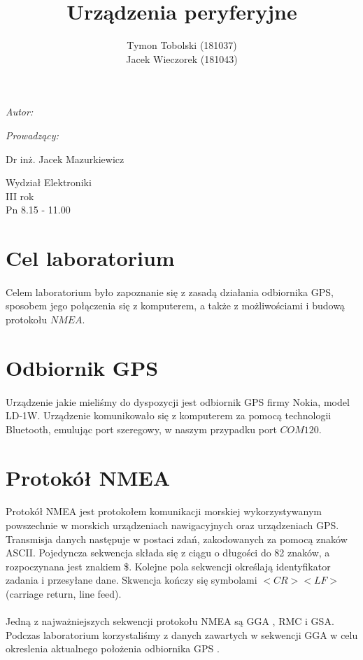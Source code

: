\documentclass[wide,a4paper,titlepage,12pt] {article}
\title{Urządzenia peryferyjne}
\author{Tymon Tobolski (181037)\\ Jacek Wieczorek (181043)}
\makeatletter
\renewcommand{\maketitle}{
\begin{titlepage}
  \begin{center}
    \vspace*{3cm}
    \LARGE \@title \par
    \vspace{2cm}
    \textit{\small Autor:}\par
    \normalsize \@author\par \normalsize
    \vspace{3cm}
    \textit{\small Prowadzący:}\par
    Dr inż. Jacek Mazurkiewicz \par
    \vspace{2cm}
    Wydział Elektroniki\\ III rok\\ Pn 8.15 - 11.00\par
    \vspace{4cm}
    \small \@date
  \end{center}
\end{titlepage}
}
\makeatother
\begin{document}
\maketitle

\section{Cel laboratorium}
\paragraph{}
Celem laboratorium było zapoznanie się z zasadą działania odbiornika GPS, sposobem jego połączenia się z komputerem, a także z możliwościami i budową protokołu $NMEA$.

\section{Odbiornik GPS}
\paragraph{}
Urządzenie jakie mieliśmy do dyspozycji jest odbiornik GPS firmy Nokia, model LD-1W. Urządzenie komunikowało się z komputerem za pomocą technologii Bluetooth, emulując port szeregowy, w naszym przypadku port $COM120$.

\section{Protokół NMEA}
\paragraph{}
Protokół NMEA jest protokołem komunikacji morskiej wykorzystywanym powszechnie w morskich urządzeniach nawigacyjnych oraz urządzeniach GPS. Transmisja danych następuje w postaci zdań, zakodowanych za pomocą znaków ASCII. Pojedyncza sekwencja składa się z ciągu o długości do 82 znaków, a rozpoczynana jest znakiem \$. Kolejne pola sekwencji określają identyfikator zadania i przesyłane dane. Skwencja kończy się symbolami $<CR><LF>$ (carriage return, line feed).

\paragraph{}
Jedną z najważniejszych sekwencji protokołu NMEA są GGA , RMC i GSA. Podczas laboratorium korzystaliśmy z danych zawartych w sekwencji GGA w celu okreslenia aktualnego położenia odbiornika GPS .
\end{document}
